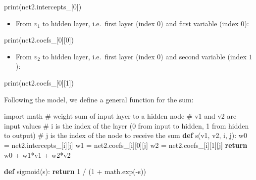 \documentclass[
  letterpaper,
]{scrbook}
\newenvironment{Shaded}{\begin{snugshade}}{\end{snugshade}}
\newcommand{\BuiltInTok}[1]{\textcolor[rgb]{0.00,0.23,0.31}{#1}}
\newcommand{\CommentTok}[1]{\textcolor[rgb]{0.37,0.37,0.37}{#1}}
\newcommand{\ControlFlowTok}[1]{\textcolor[rgb]{0.00,0.23,0.31}{\textbf{#1}}}
\newcommand{\DecValTok}[1]{\textcolor[rgb]{0.68,0.00,0.00}{#1}}
\newcommand{\ImportTok}[1]{\textcolor[rgb]{0.00,0.46,0.62}{#1}}
\newcommand{\KeywordTok}[1]{\textcolor[rgb]{0.00,0.23,0.31}{\textbf{#1}}}
\newcommand{\NormalTok}[1]{\textcolor[rgb]{0.00,0.23,0.31}{#1}}
\newcommand{\OperatorTok}[1]{\textcolor[rgb]{0.37,0.37,0.37}{#1}}
\providecommand{\tightlist}{%
  \setlength{\itemsep}{0pt}\setlength{\parskip}{0pt}}
\begin{document}
\begin{Shaded}
\begin{Highlighting}[]
\BuiltInTok{print}\NormalTok{(net2.intercepts\_[}\DecValTok{0}\NormalTok{])}
\end{Highlighting}
\end{Shaded}

\begin{itemize}
\tightlist
\item
  From \(v_1\) to hidden layer, i.e.~first layer (index \(0\)) and first
  variable (index \(0\)):
\end{itemize}

\begin{Shaded}
\begin{Highlighting}[]
\BuiltInTok{print}\NormalTok{(net2.coefs\_[}\DecValTok{0}\NormalTok{][}\DecValTok{0}\NormalTok{])}
\end{Highlighting}
\end{Shaded}

\begin{itemize}
\tightlist
\item
  From \(v_2\) to hidden layer, i.e.~first layer (index \(0\)) and
  second variable (index \(1\)):
\end{itemize}

\begin{Shaded}
\begin{Highlighting}[]
\BuiltInTok{print}\NormalTok{(net2.coefs\_[}\DecValTok{0}\NormalTok{][}\DecValTok{1}\NormalTok{])}
\end{Highlighting}
\end{Shaded}

Following the model, we define a general function for the sum:

\begin{Shaded}
\begin{Highlighting}[]
\ImportTok{import}\NormalTok{ math}
\CommentTok{\# weight sum of input layer to a hidden node}
\CommentTok{\# v1 and v2 are input values}
\CommentTok{\# i is the index of the layer (0 from input to hidden, 1 from hidden to output)}
\CommentTok{\# j is the index of the node to receive the sum}
\KeywordTok{def}\NormalTok{ s(v1, v2, i, j): }
\NormalTok{    w0 }\OperatorTok{=}\NormalTok{ net2.intercepts\_[i][j]}
\NormalTok{    w1 }\OperatorTok{=}\NormalTok{ net2.coefs\_[i][}\DecValTok{0}\NormalTok{][j]}
\NormalTok{    w2 }\OperatorTok{=}\NormalTok{ net2.coefs\_[i][}\DecValTok{1}\NormalTok{][j]}
    \ControlFlowTok{return}\NormalTok{ w0 }\OperatorTok{+}\NormalTok{ w1}\OperatorTok{*}\NormalTok{v1 }\OperatorTok{+}\NormalTok{ w2}\OperatorTok{*}\NormalTok{v2}

\KeywordTok{def}\NormalTok{ sigmoid(s):}
    \ControlFlowTok{return} \DecValTok{1} \OperatorTok{/}\NormalTok{ (}\DecValTok{1} \OperatorTok{+}\NormalTok{ math.exp(}\OperatorTok{{-}}\NormalTok{s))}
\end{Highlighting}
\end{Shaded}
\end{document}

